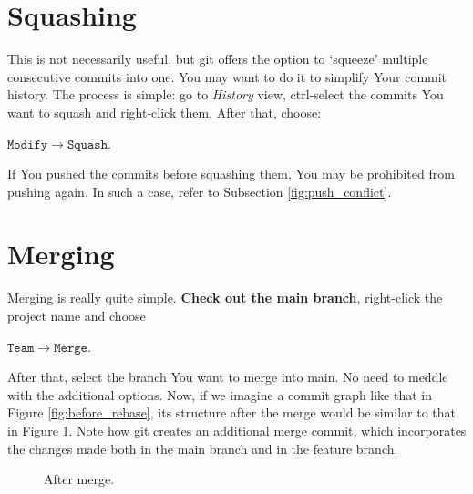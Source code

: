 \documentclass{article}
\begin{document}
\section{Squashing}
\label{sec:squashing}
This is not necessarily useful, but git offers the option to `squeeze' multiple consecutive commits into one. You may want to do it to simplify Your commit history. The process is simple: go to \textit{History} view, ctrl-select the commits You want to squash and right-click them. After that, choose:\newline

$\mathtt{Modify\rightarrow Squash}$.\newline

If You pushed the commits before squashing them, You may be prohibited from pushing again. In such a case, refer to Subsection \ref{fig:push_conflict}.

\section{Merging}
\label{sec:merging}
Merging is really quite simple. \textbf{Check out the main branch}, right-click the project name and choose\newline

$\mathtt{Team\rightarrow Merge}$.\newline

After that, select the branch You want to merge into main. No need to meddle with the additional options. Now, if we imagine a commit graph like that in Figure \ref{fig:before_rebase}, its structure after the merge would be similar to that in Figure \ref{fig:after_merge}. Note how git creates an additional merge commit, which incorporates the changes made both in the main branch and in the feature branch.

\begin{figure}
\centering
{}
\caption{After merge.}
\label{fig:after_merge}
\end{figure}
\end{document}
